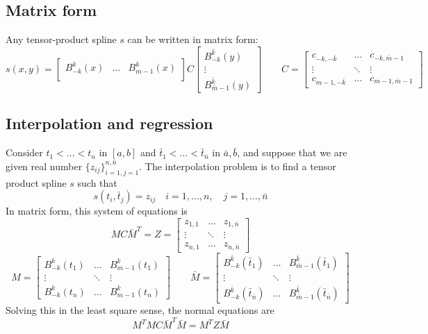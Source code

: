 \documentclass[12pt, openany]{report}
\theoremstyle{definition}
\begin{document}
\subsection{Matrix form}
Any tensor-product spline $s$ can be written in matrix form:
\begin{equation}
    s(x,y) = \begin{bmatrix}
        B_{-k}^k(x) &\dots& B_{m-1}^k(x)\\
    \end{bmatrix}C \begin{bmatrix}
        B_{-k}^{\bar k}(y)\\ \vdots\\ B_{\bar m-1}^{\bar k}(y)
    \end{bmatrix} \qquad C = \begin{bmatrix}
        c_{-k, -\bar k}& \dots& c_{-k,\bar m-1}\\
        \vdots & \ddots & \vdots\\
        c_{m-1,-\bar k}& \dots& c_{m-1,\bar m-1}
    \end{bmatrix}
\end{equation}
\subsection{Interpolation and regression}
Consider $t_1<\dots<t_n$ in $[a,b]$ and $\bar t_1<\dots<\bar t_{\bar n}$ in $\bar a,\bar b$, and suppose that we are given real number $\{z_{ij}\}_{i=1,j=1}^{n,\bar n}$. The interpolation problem is to find a tensor product spline $s$ such that 
\begin{equation}
    s(t_i,\bar t_j) = z_{ij}\quad i=1,\dots,n,\quad j=1,\dots,\bar n
\end{equation}
In matrix form, this system of equations is 
\begin{equation}
    MC\bar M^T = Z = \begin{bmatrix}
        z_{1,1}&\dots&z_{1,\bar n}\\
        \vdots & \ddots & \vdots\\
        z_{n,1}&\dots&z_{n,\bar n}
    \end{bmatrix}
\end{equation}
\begin{equation}
    M = \begin{bmatrix}
        B_{-k}^k(t_1) & \dots & B_{m-1}^k(t_1)\\
        \vdots & \ddots & \vdots\\
        B_{-k}^k(t_n) & \dots & B_{m-1}^k(t_n)
    \end{bmatrix}\qquad \bar M = \begin{bmatrix}
        B_{-k}^{\bar k}(\bar t_1) & \dots & B_{\bar m-1}^{\bar k}(\bar t_1)\\
        \vdots & \ddots & \vdots\\
        B_{-k}^{\bar k}(\bar t_{\bar n}) & \dots & B_{\bar m-1}^{\bar k}(\bar t_{\bar n})
    \end{bmatrix}
\end{equation}
Solving this in the least square sense, the normal equations are 
\begin{equation}
    M^TMC\bar M^T\bar M = M^TZ\bar M 
\end{equation}
\end{document}
